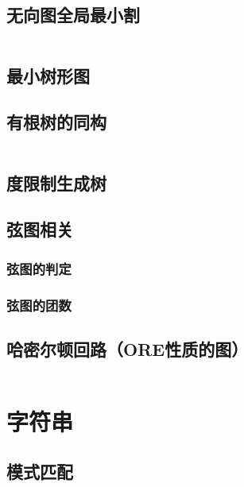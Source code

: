 \documentclass[a4paper]{article}
\newcommand{\cppcode}[1]{
    \inputminted[mathescape]{cpp}{source/#1}
}
\begin{document}
\cppcode{graph-theory/maximum-matching-blossom.cpp}

\subsection{无向图全局最小割}

\cppcode{graph-theory/minimum-cut-stoer-wagner.cpp}

\subsection{最小树形图}

\subsection{有根树的同构}

\cppcode{graph-theory/rooted-tree-isomorphism.cpp}

\subsection{度限制生成树}

\subsection{弦图相关}

\subsubsection{弦图的判定}

\subsubsection{弦图的团数}

\subsection{哈密尔顿回路（ORE性质的图）}

\cppcode{graph-theory/hamiltonian-circuit-ore.cpp}

\section{字符串}

\subsection{模式匹配}
\end{document}
